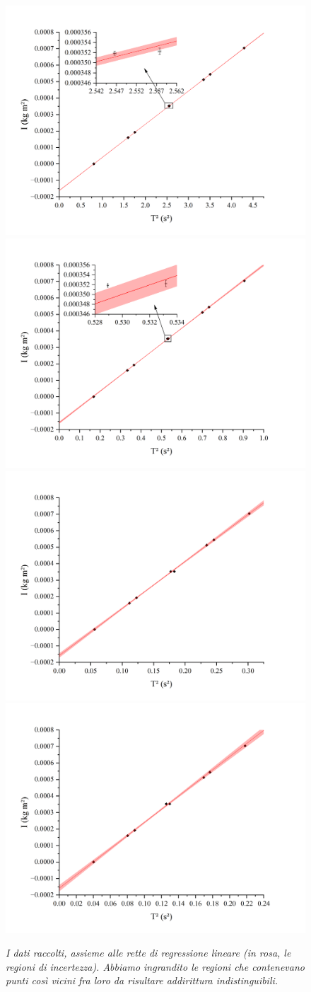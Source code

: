 \documentclass{article}
\begin{document}
\begin{center}
    \begin{figure}[H]
        \includegraphics[trim={1.4cm .5cm 3.1cm 2.1cm},clip,width=.5\textwidth]{img/Reg1.jpg}
        \includegraphics[trim={1.4cm .5cm 3.1cm 2.1cm},clip,width=.5\textwidth]{img/Reg2.jpg}
        \includegraphics[trim={1.4cm .5cm 3.1cm 2.1cm},clip,width=.5\textwidth]{img/Reg3.jpg}
        \includegraphics[trim={1.4cm .5cm 3.1cm 2.1cm},clip,width=.5\textwidth]{img/Reg4.jpg}
        \caption{\emph{
            I dati raccolti, assieme alle rette di regressione lineare
            (in rosa, le regioni di incertezza).
            Abbiamo ingrandito le regioni che
            contenevano punti così vicini fra loro da
            risultare addirittura indistinguibili.
        }}
    \end{figure}
\end{center}
\end{document}
